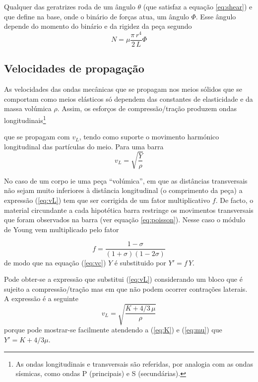 \documentclass[a4paper,12pt]{article}
\begin{document}
Qualquer das geratrizes roda de um ângulo $\theta$ (que satisfaz a equação 	\ref{eq:shear}) e que define na base, onde o binário de forças atua, um ângulo $\Phi$. Esse ângulo depende do momento do binário e da rigidez da peça segundo 
\begin{equation}
	\label{eq:binario}
	 N= \mu \frac{\pi\,r^4}{2\,L} \Phi 
\end{equation}

\subsection{\sf Velocidades de propagação  }

As velocidades das ondas mecânicas que se propagam nos meios sólidos que se comportam como meios elásticos só dependem das constantes de elasticidade e da massa volúmica $\rho$.
Assim, os esforços de compressão/tração produzem ondas longitudinais\footnote{As ondas longitudinais e transversais são referidas, por analogia com as ondas sísmicas, como ondas P (principais) e S (secundárias).} 

que se propagam com $v_L$, tendo como suporte o movimento harmónico longitudinal das partículas do meio. Para uma barra 
\begin{equation}
	\label{eq:vL}
	 v_L = \sqrt{\frac{Y}{\rho}}
\end{equation}

No caso de um corpo ie uma peça “volúmica”, em que as distâncias transversais não sejam muito inferiores à distância longitudinal (o comprimento da peça) a expressão (\ref{eq:vL}) tem que ser corrigida de um fator multiplicativo $f$. De facto, o material circundante a cada hipotética barra restringe os movimentos transversais que foram observados na barra (ver equação \ref{eq:poisson}). Nesse caso o módulo de Young vem multiplicado pelo fator

\begin{equation}
	\label{eq:f}
	f = \frac{1-\sigma}{(1+\sigma)(1-2\sigma)} 
\end{equation}
de modo que na equação (\ref{eq:vc}) $Y$ é substituido por $Y'=f\,Y$.

Pode obter-se a expressão que substitui (\ref{eq:vL})  considerando um bloco que é sujeito a compressão/tração mas em que não podem ocorrer contrações laterais. A expressão é a seguinte
\begin{equation}
	\label{eq:vL2}
	 v_L = \sqrt{\frac{K + 4/3\,\mu}{\rho}}
\end{equation}
porque pode mostrar-se facilmente atendendo a (\ref{eq:K}) e (\ref{eq:mu}) que  $Y'=K + 4/3\mu$.
\end{document}
